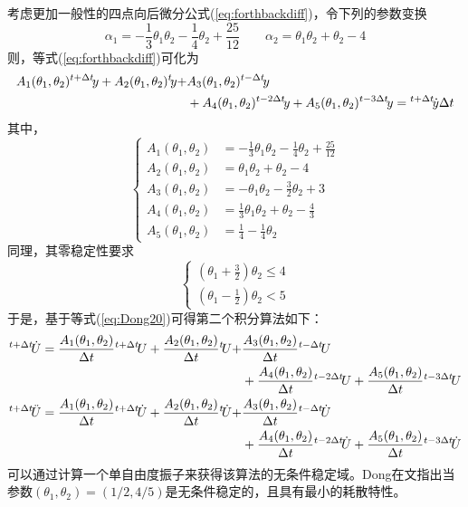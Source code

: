 考虑更加一般性的四点向后微分公式(\ref{eq:forthbackdiff})，令下列的参数变换
\begin{equation}
\alpha_1=-\frac{1}{3}\theta_1\theta_2-\frac{1}{4}\theta_2+\frac{25}{12}\qquad \alpha_2=\theta_1\theta_2+\theta_2-4
\end{equation}
则，等式(\ref{eq:forthbackdiff})可化为
\begin{align}
A_1(\theta_1,\theta_2){^{t+\Delta t}\!y}+A_2(\theta_1,\theta_2){^{t}\!y}+&A_3(\theta_1,\theta_2){^{t-\Delta t}\!y}\notag\\
&+A_4(\theta_1,\theta_2){^{t-2\Delta t}\!y}+A_5(\theta_1,\theta_2){^{t-3\Delta t}\!y}={^{t+\Delta t}\!\dot{y}\Delta t}\label{eq:Dong20}
\end{align}
其中，
\begin{equation}
\left\{\begin{aligned}
A_1(\theta_1,\theta_2)&=-\frac{1}{3}\theta_1\theta_2-\frac{1}{4}\theta_2+\frac{25}{12}\\
A_2(\theta_1,\theta_2)&=\theta_1\theta_2+\theta_2-4\\
A_3(\theta_1,\theta_2)&=-\theta_1\theta_2-\frac{3}{2}\theta_2+3\\
A_4(\theta_1,\theta_2)&=\frac{1}{3}\theta_1\theta_2+\theta_2-\frac{4}{3}\\
A_5(\theta_1,\theta_2)&=\frac{1}{4}-\frac{1}{4}\theta_2 
\end{aligned}\right.
\end{equation}
同理，其零稳定性要求
\begin{equation}
\begin{cases}
(\theta_1+\frac{3}{2})\theta_2\le4\\
(\theta_1-\frac{1}{2})\theta_2<5
\end{cases}
\end{equation}
于是，基于等式(\ref{eq:Dong20})可得第二个积分算法如下：
\begin{align}
{^{t+\Delta t}\!\dot{U}}=\frac{A_1(\theta_1,\theta_2)}{\Delta t}{^{t+\Delta t}\!U}+\frac{A_2(\theta_1,\theta_2)}{\Delta t}{^{t}\!U}+&\frac{A_3(\theta_1,\theta_2)}{\Delta t}{^{t-\Delta t}\!U}\notag\\
&+\frac{A_4(\theta_1,\theta_2)}{\Delta t}{^{t-2\Delta t}\!U}+\frac{A_5(\theta_1,\theta_2)}{\Delta t}{^{t-3\Delta t}\!U}\\
{^{t+\Delta t}\!\ddot{U}}=\frac{A_1(\theta_1,\theta_2)}{\Delta t}{^{t+\Delta t}\!\dot{U}}+\frac{A_2(\theta_1,\theta_2)}{\Delta t}{^{t}\!\dot{U}}+&\frac{A_3(\theta_1,\theta_2)}{\Delta t}{^{t-\Delta t}\!\dot{U}}\notag\\
&+\frac{A_4(\theta_1,\theta_2)}{\Delta t}{^{t-2\Delta t}\!\dot{U}}+\frac{A_5(\theta_1,\theta_2)}{\Delta t}{^{t-3\Delta t}\!\dot{U}}
\end{align}
可以通过计算一个单自由度振子来获得该算法的无条件稳定域。Dong在文指出当参数$(\theta_1,\theta_2)=(1/2,4/5)$是无条件稳定的，且具有最小的耗散特性。

